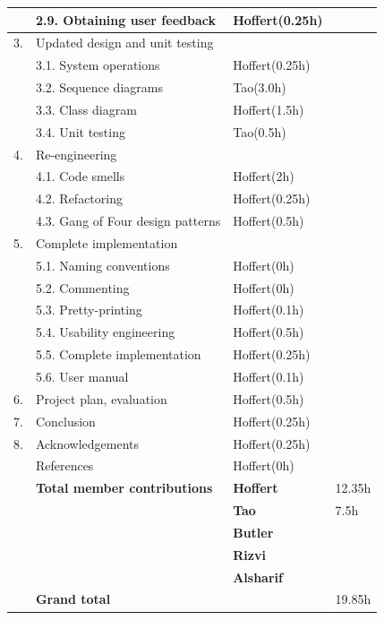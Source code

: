 \documentclass[12pt,a4paper]{article}
\begin{document}
\begin{longtable}{| p{0.2cm} p{6.25cm} | p{3cm}| p{5cm} |}
   & 2.9. Obtaining user feedback & Hoffert(0.25h) &  \\ \hline
  3. & Updated design and unit testing &  &  \\ \hline
   & 3.1. System operations & Hoffert(0.25h) &  \\ \hline
   & 3.2. Sequence diagrams & Tao(3.0h) &  \\ \hline
   & 3.3. Class diagram & Hoffert(1.5h) &  \\ \hline
   & 3.4. Unit testing & Tao(0.5h) &  \\ \hline
  4. & Re-engineering &  &  \\ \hline
   & 4.1. Code smells & Hoffert(2h) &  \\ \hline
   & 4.2. Refactoring & Hoffert(0.25h) &  \\ \hline
   & 4.3. Gang of Four design patterns & Hoffert(0.5h) &  \\ \hline
  5. & Complete implementation &  &  \\ \hline
   & 5.1. Naming conventions & Hoffert(0h) &  \\ \hline
   & 5.2. Commenting & Hoffert(0h) &  \\ \hline
   & 5.3. Pretty-printing & Hoffert(0.1h) &  \\ \hline
   & 5.4. Usability engineering & Hoffert(0.5h) &  \\ \hline
   & 5.5. Complete implementation & Hoffert(0.25h) &  \\ \hline
   & 5.6. User manual & Hoffert(0.1h) &  \\ \hline
  6. & Project plan, evaluation & Hoffert(0.5h) &  \\ \hline
  7. & Conclusion & Hoffert(0.25h) &  \\ \hline
  8. & Acknowledgements & Hoffert(0.25h) &  \\ \hline
   & References & Hoffert(0h) &  \\ \hline
    & \textbf{Total member contributions} & \textbf{Hoffert} & 12.35h \\ \cline{3-4}
    &  & \textbf{Tao} & 7.5h \\ \cline{3-4}
    &  & \textbf{Butler} & \\ \cline{3-4}
    &  & \textbf{Rizvi} & \\ \cline{3-4}
    &  & \textbf{Alsharif} & \\ \hline
    & \textbf{Grand total} &  & 19.85h \\ \hline
\end{longtable}
\end{document}
